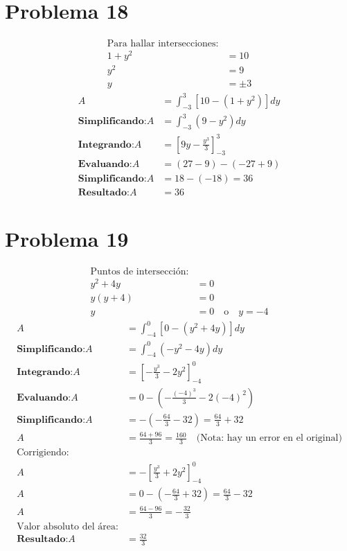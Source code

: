 \documentclass[12pt]{article}
\newcommand{\problema}[1]{\section*{Problema #1}}
\newcommand{\integrando}{\textbf{Integrando:} }
\newcommand{\evaluando}{\textbf{Evaluando:} }
\newcommand{\simplificando}{\textbf{Simplificando:} }
\newcommand{\obteniendo}{\textbf{Resultado:} }
\begin{document}
	\vspace{0.5cm}
	
	\problema{18}
	\begin{align*}
		\text{Para hallar intersecciones:} \\
		1 + y^2 &= 10 \\
		y^2 &= 9 \\
		y &= \pm 3
	\end{align*}
	\begin{align*}
		A &= \int_{-3}^{3} \left[ 10 - (1 + y^2) \right] dy \\
		\simplificando A &= \int_{-3}^{3} (9 - y^2) dy \\
		\integrando A &= \left[ 9y - \frac{y^3}{3} \right]_{-3}^{3} \\
		\evaluando A &= \left(27 - 9\right) - \left(-27 + 9\right) \\
		\simplificando A &= 18 - (-18) = 36 \\
		\obteniendo A &= \boxed{36}
	\end{align*}
	
	\vspace{0.5cm}
	
	\problema{19}
	\begin{align*}
		\text{Puntos de intersección:} \\
		y^2 + 4y &= 0 \\
		y(y + 4) &= 0 \\
		y &= 0 \quad \text{o} \quad y = -4
	\end{align*}
	\begin{align*}
		A &= \int_{-4}^{0} \left[ 0 - (y^2 + 4y) \right] dy \\
		\simplificando A &= \int_{-4}^{0} (-y^2 - 4y) dy \\
		\integrando A &= \left[ -\frac{y^3}{3} - 2y^2 \right]_{-4}^{0} \\
		\evaluando A &= 0 - \left( -\frac{(-4)^3}{3} - 2(-4)^2 \right) \\
		\simplificando A &= -\left( -\frac{64}{3} - 32 \right) = \frac{64}{3} + 32 \\
		A &= \frac{64 + 96}{3} = \frac{160}{3} \quad \text{(Nota: hay un error en el original)} \\
		\text{Corrigiendo:} \\
		A &= -\left[ \frac{y^3}{3} + 2y^2 \right]_{-4}^{0} \\
		A &= 0 - \left( -\frac{64}{3} + 32 \right) = \frac{64}{3} - 32 \\
		A &= \frac{64 - 96}{3} = -\frac{32}{3} \\
		\text{Valor absoluto del área:} \\
		\obteniendo A &= \boxed{\frac{32}{3}}
	\end{align*}
	
\end{document}
